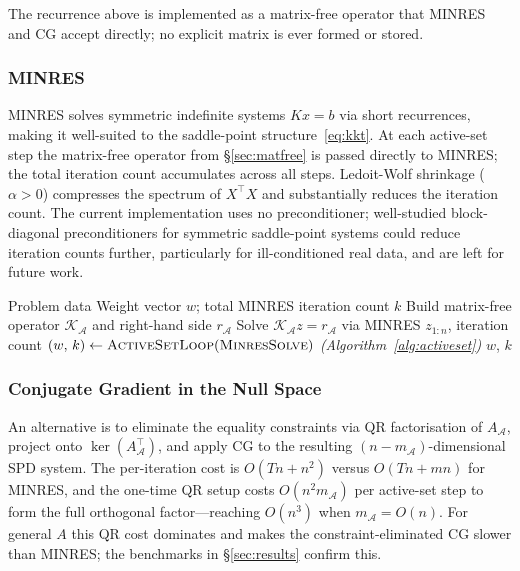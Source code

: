 \documentclass{siam/siamart}
\begin{document}
The recurrence above is implemented as a matrix-free operator that MINRES and
CG accept directly; no explicit matrix is ever formed or stored.

\subsubsection{MINRES}\label{sec:minres}

MINRES \cite{paige1975} solves symmetric indefinite systems $Kx = b$ via
short recurrences, making it well-suited to the saddle-point
structure~\eqref{eq:kkt}.  At each active-set step the matrix-free operator
from \S\ref{sec:matfree} is passed directly to MINRES; the total iteration count accumulates
across all steps.  Ledoit-Wolf shrinkage ($\alpha > 0$) compresses the spectrum of $X^\top X$ and substantially
reduces the iteration count.  The current implementation uses no preconditioner;
well-studied block-diagonal preconditioners for symmetric saddle-point systems
\cite{benzi2005} could reduce iteration counts further, particularly for
ill-conditioned real data, and are left for future work.

\begin{algorithm}[ht]
\caption{MINRES solver}\label{alg:minres}
\begin{algorithmic}[1]
\Require Problem data
\Ensure Weight vector $w$;\; total MINRES iteration count $k$
  \State Build matrix-free operator $\mathcal{K}_{\mathcal{A}}$ and right-hand side $r_{\mathcal{A}}$
  \State Solve $\mathcal{K}_{\mathcal{A}} z = r_{\mathcal{A}}$ via MINRES \cite{paige1975}
  \State \Return $z_{1:n}$,\; iteration count
\EndFunction
\State $(w,\, k) \leftarrow \textsc{ActiveSetLoop}(\textsc{MinresSolve})$
  \hfill\textit{(Algorithm~\ref{alg:activeset})}
\State \Return $w$, $k$
\end{algorithmic}
\end{algorithm}

\subsubsection{Conjugate Gradient in the Null Space}\label{sec:cg}

An alternative is to eliminate the equality constraints via QR factorisation of
$A_{\mathcal{A}}$, project onto $\ker(A_{\mathcal{A}}^\top)$, and apply CG
\cite{hestenes1952} to the resulting $(n - m_{\mathcal{A}})$-dimensional SPD system.
The per-iteration cost is $O(Tn + n^2)$ versus $O(Tn + mn)$ for MINRES, and the
one-time QR setup costs $O(n^2 m_{\mathcal{A}})$ per active-set step to form the
full orthogonal factor---reaching $O(n^3)$ when $m_{\mathcal{A}} = O(n)$.  For
general $A$ this QR cost dominates and makes the constraint-eliminated CG slower
than MINRES; the benchmarks in \S\ref{sec:results} confirm this.
\end{document}

